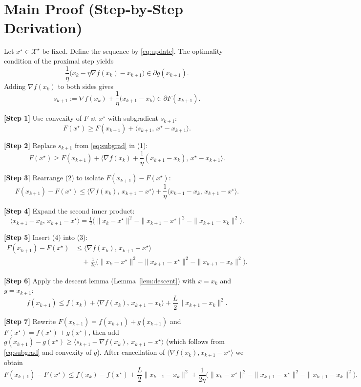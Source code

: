 \documentclass{article}
\begin{document}
\section*{Main Proof (Step‑by‑Step Derivation)}
Let $x^{\star}\in\mathcal{X}^{\star}$ be fixed. Define the sequence by \eqref{eq:update}.  
The optimality condition of the proximal step yields
\begin{equation}\label{eq:optcond}
\frac{1}{\eta}\bigl(x_{k}-\eta\nabla f(x_{k})-x_{k+1}\bigr)\in\partial g(x_{k+1}).
\end{equation}
Adding $\nabla f(x_{k})$ to both sides gives
\begin{equation}\label{eq:subgrad}
s_{k+1}:=\nabla f(x_{k})+\frac{1}{\eta}\bigl(x_{k+1}-x_{k}\bigr)\in\partial F(x_{k+1}).
\end{equation}

\bigskip
\noindent\textbf{[Step 1]} \;Use convexity of $F$ at $x^{\star}$ with subgradient $s_{k+1}$:
\[
F(x^{\star})\ge F(x_{k+1})+\langle s_{k+1},\,x^{\star}-x_{k+1}\rangle.
\tag{1}
\]

\noindent\textbf{[Step 2]} \;Replace $s_{k+1}$ from \eqref{eq:subgrad} in (1):
\[
F(x^{\star})\ge F(x_{k+1})+\Big\langle\nabla f(x_{k})+\frac{1}{\eta}(x_{k+1}-x_{k}),\,x^{\star}-x_{k+1}\Big\rangle.
\tag{2}
\]

\noindent\textbf{[Step 3]} \;Rearrange (2) to isolate $F(x_{k+1})-F(x^{\star})$:
\[
F(x_{k+1})-F(x^{\star})\le
\langle\nabla f(x_{k}),\,x_{k+1}-x^{\star}\rangle
+\frac{1}{\eta}\langle x_{k+1}-x_{k},\,x_{k+1}-x^{\star}\rangle.
\tag{3}
\]

\noindent\textbf{[Step 4]} \;Expand the second inner product:
\[
\langle x_{k+1}-x_{k},\,x_{k+1}-x^{\star}\rangle
=\tfrac12\Big(\|x_{k}-x^{\star}\|^{2}-\|x_{k+1}-x^{\star}\|^{2}
-\|x_{k+1}-x_{k}\|^{2}\Big).
\tag{4}
\]

\noindent\textbf{[Step 5]} \;Insert (4) into (3):
\[
\begin{aligned}
F(x_{k+1})-F(x^{\star})
&\le \langle\nabla f(x_{k}),\,x_{k+1}-x^{\star}\rangle\\
&\quad+\frac{1}{2\eta}\Big(\|x_{k}-x^{\star}\|^{2}
-\|x_{k+1}-x^{\star}\|^{2}
-\|x_{k+1}-x_{k}\|^{2}\Big).
\end{aligned}
\tag{5}
\]

\noindent\textbf{[Step 6]} \;Apply the descent lemma (Lemma~\ref{lem:descent}) with $x=x_{k}$ and $y=x_{k+1}$:
\[
f(x_{k+1})\le f(x_{k})+\langle\nabla f(x_{k}),\,x_{k+1}-x_{k}\rangle+\frac{L}{2}\|x_{k+1}-x_{k}\|^{2}.
\tag{6}
\]

\noindent\textbf{[Step 7]} \;Rewrite $F(x_{k+1})=f(x_{k+1})+g(x_{k+1})$ and $F(x^{\star})=f(x^{\star})+g(x^{\star})$, then add $g(x_{k+1})-g(x^{\star})\ge\langle s_{k+1}-\nabla f(x_{k}),\,x_{k+1}-x^{\star}\rangle$ (which follows from \eqref{eq:subgrad} and convexity of $g$). After cancellation of $\langle\nabla f(x_{k}),x_{k+1}-x^{\star}\rangle$ we obtain
\[
F(x_{k+1})-F(x^{\star})
\le f(x_{k})-f(x^{\star})
+\frac{L}{2}\|x_{k+1}-x_{k}\|^{2}
+\frac{1}{2\eta}\Big(\|x_{k}-x^{\star}\|^{2}
-\|x_{k+1}-x^{\star}\|^{2}
-\|x_{k+1}-x_{k}\|^{2}\Big).
\tag{7}
\]
\end{document}
